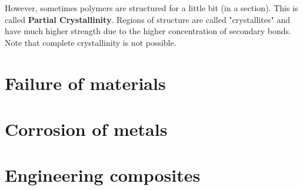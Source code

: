 \documentclass[12pt]{article}
\begin{document}
However, sometimes polymers are structured for a little bit (in a section).
This is called \textbf{Partial Crystallinity}.
Regions of structure are called "crystallites" and have much higher strength due to the higher concentration of secondary bonds. 
Note that complete crystallinity is not possible.

\section{Failure of materials}
\section{Corrosion of metals}
\section{Engineering composites}
\end{document}
